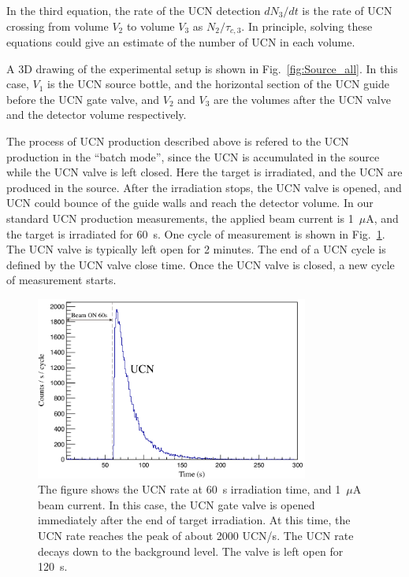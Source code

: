 In the third equation, the rate of the UCN detection $dN_3/dt$ is the
rate of UCN crossing from volume $V_2$ to volume $V_3$ as
$N_2/\tau_{c,3}$. In principle, solving these equations could give an
estimate of the number of UCN in each volume.

A 3D drawing of the experimental setup is shown in
Fig.~\ref{fig:Source_all}. In this case, $V_1$ is the UCN source
bottle, and the horizontal section of the UCN guide before the UCN gate
valve, and $V_2$ and $V_3$ are the volumes after the UCN valve and the
detector volume respectively.


The process of UCN production described above is refered to the UCN
production in the ``batch mode'', since the UCN is accumulated in the
source while the UCN valve is left closed. Here the target is
irradiated, and the UCN are produced in the source. After the
irradiation stops, the UCN valve is opened, and UCN could bounce of
the guide walls and reach the detector volume. In our standard UCN
production measurements, the applied beam current is 1~$\mu$A, and the
target is irradiated for 60~s. One cycle of measurement is shown in
Fig.~\ref{fig:UCNRate}. The UCN valve is typically left open for 2
minutes. The end of a UCN cycle is defined by the UCN valve close
time. Once the UCN valve is closed, a new cycle of measurement starts.


\begin{figure}[h!]
  \centering
  \includegraphics[width=0.8\textwidth]{UCNRate.png}
  \caption{The figure shows the UCN rate at 60~s irradiation time, and
    1~$\mu$A beam current. In this case, the UCN gate valve is opened
    immediately after the end of target irradiation. At this time, the
    UCN rate reaches the peak of about 2000 UCN/s. The UCN rate decays
    down to the background level. The valve is left open for 120~s. }
  \label{fig:UCNRate}
\end{figure}


